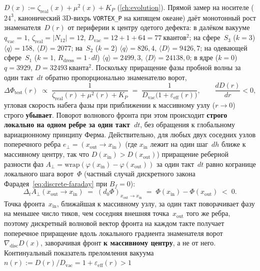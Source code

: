 \begin{remark}
\begin{enumerate}[label=(\arabic*)]
  $D(x) := \zeta_{\mathrm{real}}(x)+\mu^2(x)+K_P$ (\cref{ch:evolution}).
  Прямой замер на носителе ($24^3$, канонический 3D-вихрь \texttt{VORTEX\_P} на кипящем океане)
  даёт монотонный рост знаменателя~$D(r)$ от периферии к центру одетого дефекта:
  в далёком вакууме $q_{\mathrm{vac}}=1$, $\zeta_{\mathrm{real}}=|N_{12}|=12$, $D_{\mathrm{vac}}=12+1+64=77\ \text{квантов}^2$;
  на сфере~$S_3$ ($k=3$) $\langle q\rangle=158$, $\langle D\rangle=2077$;
  на~$S_2$ ($k=2$) $\langle q\rangle=826{,}4$, $\langle D\rangle=9426{,}7$;
  на одевающей сфере~$S_1$ ($k=1$, $R_{\mathrm{dress}}=1\cdot dl$) $\langle q\rangle=2499{,}3$, $\langle D\rangle=24138{,}0$;
  в ядре ($k=0$) $q=3929$, $D=32493\ \text{кванта}^2$.
  Поскольку приращение фазы пробной волны за один такт~$dt$ обратно пропорционально знаменателю ворот,
  \[
    \Delta\Phi_{\mathrm{test}}(r) \;\propto\; \frac{1}{\zeta_{\mathrm{real}}(r)+\mu^2(r)+K_P} \;=\; \frac{1}{D_{\mathrm{vac}}\bigl(1+\varepsilon_{\mathrm{eff}}(r)\bigr)},
    \qquad
    \frac{d D(r)}{d r} < 0,
  \]
  угловая скорость набега фазы при приближении к массивному узлу ($r\to 0$) строго \textbf{убывает}.
  Поворот волнового фронта при этом происходит \textbf{строго локально на одном ребре за один такт~$dt$},
  без обращения к глобальному вариационному принципу Ферма. Действительно, для любых двух соседних узлов
  поперечного ребра $e_\perp = (x_{\mathrm{out}}\to x_{\mathrm{in}})$ (где $x_{\mathrm{in}}$ лежит на один шаг~$dh$
  ближе к массивному центру, так что $D(x_{\mathrm{in}}) > D(x_{\mathrm{out}})$) приращение реберной разности фаз
  $A_\perp = \mathrm{wrap}(\varphi(x_{\mathrm{in}})-\varphi(x_{\mathrm{out}}))$ за один такт~$dt$ равно когранице
  локального шага ворот~$\Phi$ (частный случай дискретного закона Фарадея~\eqref{eq:discrete-faraday} при $B_f=0$):
  \begin{equation}
  \label{eq:local-edge-refraction}
    \Delta_t A_\perp(x_{\mathrm{out}}\to x_{\mathrm{in}})
    \;=\;
    (d_0\Phi)_{x_{\mathrm{out}}\to x_{\mathrm{in}}}
    \;=\;
    \Phi(x_{\mathrm{in}}) - \Phi(x_{\mathrm{out}})
    \;<\; 0.
  \end{equation}
  Точка фронта~$x_{\mathrm{in}}$, ближайшая к массивному узлу, за один такт поворачивает фазу на меньшее число тиков,
  чем соседняя внешняя точка~$x_{\mathrm{out}}$ того же ребра, поэтому дискретный волновой вектор фронта на каждом
  такте получает поперечное приращение вдоль локального градиента знаменателя ворот $\nabla_{\mathrm{disc}} D(x)$,
  заворачивая фронт \textbf{к массивному центру}, а не от него.
  Континуальный показатель преломления вакуума $n(r) := D(r)/D_{\mathrm{vac}} = 1 + \varepsilon_{\mathrm{eff}}(r) > 1$

\end{enumerate}
\end{remark}
